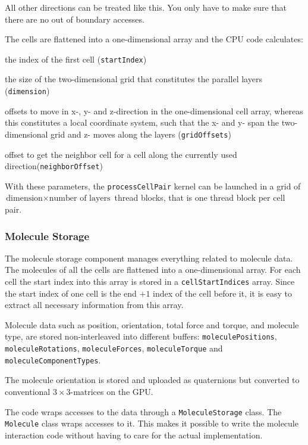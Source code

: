 All other directions can be treated like this. You only have to make sure that there are no out of boundary accesses.

The cells are flattened into a one-dimensional array and the CPU code calculates:
\begin{compactitem}
\item the index of the first cell (\lstinline!startIndex!)
\item the size of the two-dimensional grid that constitutes the parallel layers (\lstinline!dimension!)
\item offsets to move in x-, y- and z-direction in the one-dimensional cell array, whereas this constitutes a local coordinate system, such that the x- and y- span the two-dimensional grid and z- moves along the layers (\lstinline!gridOffsets!)
\item offset to get the neighbor cell for a cell along the currently used direction(\lstinline!neighborOffset!)
\end{compactitem}
With these parameters, the \lstinline!processCellPair! kernel can be launched in a grid of $ \text{dimension} \times \text{number of layers} $ thread blocks, that is one thread block per cell pair.

\subsubsection{Molecule Storage}
The molecule storage component manages everything related to molecule data. The molecules of all the cells are flattened into a one-dimensional array. For each cell the start index into this array is stored in a \lstinline!cellStartIndices! array. Since the start index of one cell is the end $ + 1 $ index of the cell before it, it is easy to extract all necessary information from this array.

Molecule data such as position, orientation, total force and torque, and molecule type, are stored non-interleaved into different buffers: \lstinline!moleculePositions!, \lstinline!moleculeRotations!, \lstinline!moleculeForces!, \lstinline!moleculeTorque! and \lstinline!moleculeComponentTypes!.

The molecule orientation is stored and uploaded as quaternions but converted to conventional $ 3 \times 3 $-matrices on the GPU.

The \cuda{} code wraps accesses to the data through a \lstinline!MoleculeStorage! class. The \lstinline!Molecule! class wraps accesses to it. This makes it possible to write the molecule interaction code without having to care for the actual implementation.


